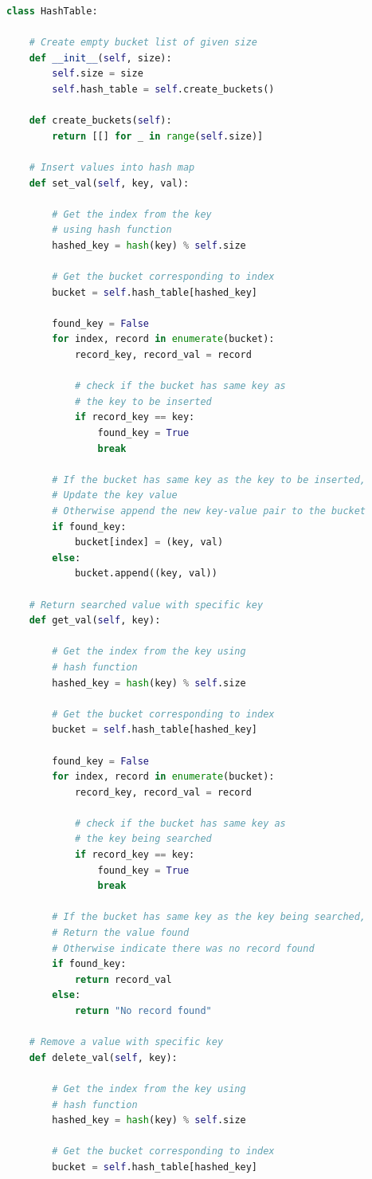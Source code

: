 \begin{lstlisting}[language=Python, caption=Implementasi Hash Map]
class HashTable:

	# Create empty bucket list of given size
	def __init__(self, size):
		self.size = size
		self.hash_table = self.create_buckets()

	def create_buckets(self):
		return [[] for _ in range(self.size)]

	# Insert values into hash map
	def set_val(self, key, val):
		
		# Get the index from the key
		# using hash function
		hashed_key = hash(key) % self.size
		
		# Get the bucket corresponding to index
		bucket = self.hash_table[hashed_key]

		found_key = False
		for index, record in enumerate(bucket):
			record_key, record_val = record
			
			# check if the bucket has same key as
			# the key to be inserted
			if record_key == key:
				found_key = True
				break

		# If the bucket has same key as the key to be inserted,
		# Update the key value
		# Otherwise append the new key-value pair to the bucket
		if found_key:
			bucket[index] = (key, val)
		else:
			bucket.append((key, val))

	# Return searched value with specific key
	def get_val(self, key):
		
		# Get the index from the key using
		# hash function
		hashed_key = hash(key) % self.size
		
		# Get the bucket corresponding to index
		bucket = self.hash_table[hashed_key]

		found_key = False
		for index, record in enumerate(bucket):
			record_key, record_val = record
			
			# check if the bucket has same key as
			# the key being searched
			if record_key == key:
				found_key = True
				break

		# If the bucket has same key as the key being searched,
		# Return the value found
		# Otherwise indicate there was no record found
		if found_key:
			return record_val
		else:
			return "No record found"

	# Remove a value with specific key
	def delete_val(self, key):
		
		# Get the index from the key using
		# hash function
		hashed_key = hash(key) % self.size
		
		# Get the bucket corresponding to index
		bucket = self.hash_table[hashed_key]


\end{lstlisting}
